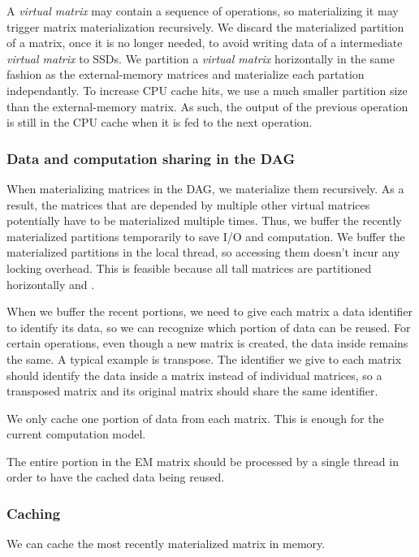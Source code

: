 A \textit{virtual matrix} may contain a sequence of operations, so materializing
it may trigger matrix materialization recursively.
We discard the materialized partition of a matrix, once it is no longer needed,
to avoid writing data of a intermediate \textit{virtual matrix} to SSDs.
We partition a \textit{virtual matrix} horizontally in the same fashion as
the external-memory matrices and materialize each partation independantly. 
To increase CPU cache hits, we use a much smaller partition size than
the external-memory matrix. As such, the output of the previous operation is
still in the CPU cache when it is fed to the next operation.

\subsubsection{Data and computation sharing in the DAG}
When materializing matrices in the DAG, we materialize them recursively.
As a result, the matrices that are depended by multiple other virtual matrices
potentially have to be materialized multiple times. Thus, we buffer the
recently materialized partitions temporarily to save I/O and computation.
We buffer the materialized partitions in the local thread, so accessing them
doesn't incur any locking overhead.
This is feasible because all tall matrices are partitioned horizontally and .


When we buffer the recent portions, we need to give each matrix a data identifier
to identify its data, so we can recognize which portion of data can be reused.
For certain operations, even though a new matrix is created, the data inside
remains the same. A typical example is transpose. The identifier we give to
each matrix should identify the data inside a matrix instead of individual matrices,
so a transposed matrix and its original matrix should share the same identifier.

We only cache one portion of data from each matrix. This is enough for the current
computation model.

The entire portion in the EM matrix should be processed by a single thread in order
to have the cached data being reused.

\subsubsection{Caching}

We can cache the most recently materialized matrix in memory.
